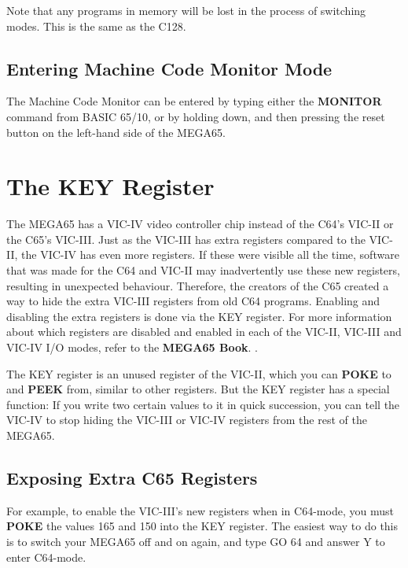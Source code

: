 Note that any programs in memory will be lost in the process of switching modes. This is the same as the C128.

\subsection{Entering Machine Code Monitor Mode}

The Machine Code Monitor can be entered by typing either the {\bf MONITOR}
command from BASIC 65/10, or by holding 
down, and then pressing the reset button on the left-hand side of the
MEGA65.

\section{The KEY Register}

The MEGA65 has a VIC-IV video controller chip instead of the C64's VIC-II or
the C65's VIC-III.  Just as the VIC-III has extra registers compared to the
VIC-II, the VIC-IV has even more registers.  If these were visible all the time,
software that was made for the C64 and VIC-II may inadvertently use these
new registers, resulting in unexpected behaviour.  Therefore, the
creators of the C65 created a way to hide the extra VIC-III registers from old
C64 programs. Enabling and disabling the extra registers is done via the KEY register. For more information
about which registers are disabled and enabled in each of the
VIC-II, VIC-III and VIC-IV I/O modes, refer to
\ifdefined\printmanual
 the {\bf MEGA65 Book}.
\else
 .
\fi


The KEY register is an unused register of the VIC-II, which you can {\bf POKE} to and
 {\bf PEEK} from, similar to other registers. But the KEY register has a special function: If
you write two certain values to it in quick succession, you can tell the VIC-IV
to stop hiding the VIC-III or VIC-IV registers from the rest of the MEGA65.

\subsection{Exposing Extra C65 Registers}

For example, to enable the VIC-III's new registers when in C64-mode, you must {\bf POKE} the values 165 and 150
into the KEY register. The easiest way to do this is to switch your MEGA65 off and on again, and type GO 64
and answer Y to enter C64-mode.

